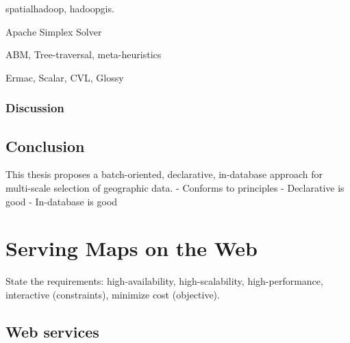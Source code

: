 \documentclass[11pt, oneside]{report}
\begin{document}
spatialhadoop, hadoopgis.

Apache Simplex Solver

ABM, Tree-traversal, meta-heuristics

Ermac, Scalar, CVL, Glossy

\subsection{Discussion}


\section{Conclusion}

This thesis proposes a batch-oriented, declarative, in-database approach for multi-scale selection of geographic data.
- Conforms to principles
- Declarative is good
- In-database is good




\chapter{Serving Maps on the Web}


State the requirements: high-availability, high-scalability, high-performance, interactive (constraints), minimize cost (objective).

\section{Web services}
\end{document}
